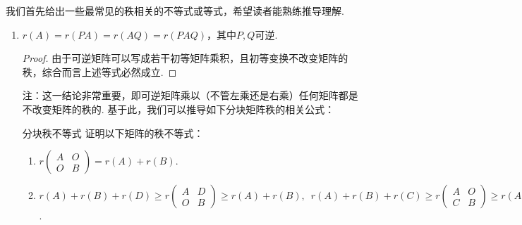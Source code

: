 我们首先给出一些最常见的秩相关的不等式或等式，希望读者能熟练推导理解.
\begin{enumerate}
    \item $r(A)=r(PA)=r(AQ)=r(PAQ)$，其中$P,Q$可逆.

          \begin{proof}
              由于可逆矩阵可以写成若干初等矩阵乘积，且初等变换不改变矩阵的秩，综合而言上述等式必然成立.
          \end{proof}

          注：这一结论非常重要，即可逆矩阵乘以（不管左乘还是右乘）任何矩阵都是不改变矩阵的秩的. 基于此，我们可以推导如下分块矩阵秩的相关公式：

          \begin{example}{}{分块秩不等式}
              证明以下矩阵的秩不等式：
              \begin{enumerate}
                  \item $r\begin{pmatrix}
                                A & O \\ O & B
                            \end{pmatrix}=r(A)+r(B)$.

                  \item $r(A)+r(B)+r(D)\geqslant r\begin{pmatrix}
                                A & D \\ O & B
                            \end{pmatrix}\geqslant r(A)+r(B),\enspace r(A)+r(B)+r(C)\geqslant r\begin{pmatrix}
                                A & O \\ C & B
                            \end{pmatrix}\geqslant r(A)+r(B)$.
              \end{enumerate}
          \end{example}


\end{enumerate}
